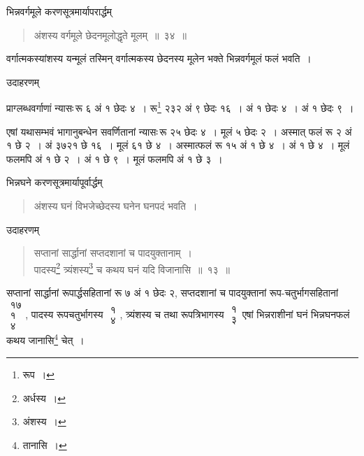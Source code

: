 \documentclass[10pt, openany]{book}
\begin{document}
{भिन्नवर्गमूले करणसूत्रमार्यापरार्द्धम्\textemdash}

 \label{34}
\begin{quote}{\bs  अंशस्य वर्गमूले छेदनमूलोद्धृते मूलम्~॥~३४~॥}\end{quote}

{वर्गात्मकस्यांशस्य यन्मूलं तस्मिन् वर्गात्मकस्य छेदनस्य मूलेन भक्ते
भिन्नवर्गमूलं फलं भवति~।}
\vspace{-2mm}

{उदाहरणम्\textemdash}
\vspace{2mm}

{प्राग्लब्धवर्गाणां न्यासः\textendash \,रू ६ अं १ छेदः ४~। रू\renewcommand{\thefootnote}{३}\footnote{रूप~।} २३२ अं ९ छेदः १६~। अं १ छेदः ४~। अं १ छेदः ९~।}
\vspace{2mm}

{एषां यथासम्भवं भागानुबन्धेन सवर्णितानां न्यासः\textendash \,रू २५ छेदः ४~। मूलं ५ छेदः २~। अस्मात् फलं रू २ अं १ छे २~। अं ३७२१ छे १६~। मूलं ६१ छे ४~। अस्मात्फलं रू १५ अं १ छे ४~। अं १ छे ४~। मूलं फलमपि अं १ छे २~। अं १ छे ९~। मूलं}
{फलमपि अं १ छे ३~।}

\newpage

{भिन्नघने करणसूत्रमार्यापूर्वार्द्धम्\textemdash}

\begin{quote}{\bs अंशस्य घनं विभजेच्छेदस्य घनेन घनपदं भवति~।}\end{quote}

{उदाहरणम्\textemdash}

\begin{quote}
    
{\eg सप्तानां सार्द्धानां सप्तदशानां च पादयुक्तानाम्~। \\
 पादस्य\renewcommand{\thefootnote}{\s १}\footnote{\s अर्धस्य~।}  त्र्यंशस्य\renewcommand{\thefootnote}{\s २}\footnote{\s अंशस्य~।}   च कथय घनं यदि विजानासि~॥~१३~॥}\end{quote}

{सप्तानां सार्द्धानां रूपार्द्धसहितानां रू ७ अं १ छेदः २, सप्तदशानां च
पादयुक्तानां रूप-चतुर्भागसहितानां $\begin{matrix}

\mbox{{१७}}\\

\mbox{{१}}\\

\mbox{{४}}

\end{matrix}$, पादस्य रूपचतुर्भागस्य $\begin{matrix}

\mbox{{१}}\\

\mbox{{४}}

\end{matrix}$, त्र्यंशस्य च तथा रूपत्रिभागस्य $\begin{matrix}

\mbox{{१}}\\

\mbox{{३}}

\end{matrix}$\textendash \,एषां भिन्नराशीनां घनं भिन्नघनफलं कथय
जानासि\renewcommand{\thefootnote}{\s ३}\footnote{\s तानासि~।} चेत्~।}
\vspace{2mm}
\end{document}
